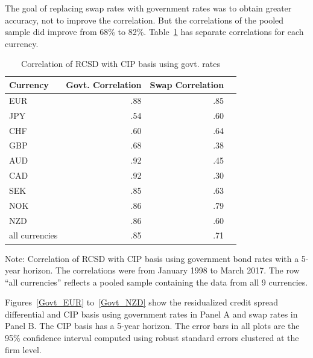 The goal of replacing swap rates with government rates was to obtain greater accuracy, not to improve the correlation.  But the correlations of the pooled sample did improve from 68\% to 82\%.   Table~\ref{govt_correl_table} has separate correlations for each currency.  


\begin{table}[h]
\caption{\label{govt_correl_table} Correlation of RCSD with CIP basis using govt. rates}
\centering
\begin{tabular}{ |l|r|r|r| }
\hline
Currency & Govt. Correlation & Swap Correlation \\
\hline
EUR & .88 & .85 \\
JPY & .54 & .60 \\
CHF & .60 & .64 \\
GBP & .68 & .38 \\
AUD & .92 & .45 \\
CAD & .92 & .30 \\
SEK & .85 & .63 \\
NOK & .86 & .79 \\
NZD & .86 & .60 \\
all currencies & .85 & .71 \\ 
\hline
\end{tabular}

\raggedright 
 Note: {\small Correlation of RCSD with CIP basis using government bond rates with a 5-year horizon.  The correlations were from January 1998 to March 2017.  The row ``all currencies'' reflects a pooled sample containing the data from all 9 currencies.  }
\end{table}


Figures~\ref{Govt_EUR} to~\ref{Govt_NZD} show the residualized credit spread differential and CIP basis using government rates in Panel A and swap rates in Panel B.  The CIP basis has a 5-year horizon.  The error bars in all plots are the 95\% confidence interval computed using robust standard errors clustered at the firm level.


